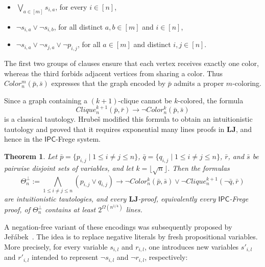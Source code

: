 \documentclass[12pt,a4paper]{article}
\theoremstyle{plain}
\newtheorem{theorem}{Theorem}
\theoremstyle{definition}
\newcommand{\LJ}{\mathbf{LJ}}
\begin{document}
\begin{itemize}
\item[$\bullet$]
$\displaystyle \bigvee_{a\in[m]} s_{i,a}$, for every $i\in[n]$,
\item[$\bullet$]
$\displaystyle \neg s_{i,a}\vee \neg s_{i,b}$, for all distinct $a,b\in[m]$ and $i\in[n]$,
\item[$\bullet$]
$\displaystyle \neg s_{i,a}\vee \neg s_{j,a}\vee \neg p_{i,j}$, for all $a\in[m]$ and distinct $i,j\in[n]$.
\end{itemize}
The first two groups of clauses ensure that each vertex receives exactly one color, whereas the third forbids adjacent vertices from sharing a color. Thus $Color^m_n(\bar p,\bar s)$ expresses that the graph encoded by $\bar p$ admits a proper $m$-coloring.

Since a graph containing a $(k+1)$-clique cannot be $k$-colored, the formula
\[
Clique^{k+1}_n(\bar{p}, \bar{r}) \to \neg Color^{k}_n(\bar{p}, \bar{s})
\]
is a classical tautology. Hrubeš \cite{Hrubes} modified this formula to obtain an intuitionistic tautology and proved that it requires exponential many lines proofs in $\mathbf{LJ}$, and hence in the $\mathsf{IPC}$-Frege system.

\begin{theorem}\label{Hrubes} \cite{Hrubes}
Let $\bar{p}=\{p_{i,j} \mid 1 \leq i \neq j \leq n\}$, $\bar{q}=\{q_{i,j} \mid 1 \leq i \neq j \leq n\}$, $\bar{r}$, and $\bar{s}$ be pairwise disjoint sets of variables, and let $k=\lfloor\sqrt{n}\rfloor$. Then the formulas
\[
\Theta^{\bot}_n := \bigwedge_{1 \leq i \neq j \leq n} (p_{i,j} \vee q_{i,j}) \to \neg Color^{k}_n(\bar{p}, \bar{s}) \vee \neg Clique^{k+1}_n(\neg \bar{q}, \bar{r})
\]
are intuitionistic tautologies, and every $\LJ$-proof, equivalently every $\mathsf{IPC}$-Frege proof, of $\Theta^{\bot}_n$ contains at least $2^{\Omega(n^{1/4})}$ lines.
\end{theorem}

A negation-free variant of these encodings was subsequently proposed by Jeřábek~\cite{jerabek}. The idea is to replace negative literals by fresh propositional variables. More precisely, for every variable $s_{i,l}$ and $r_{i,l}$, one introduces new variables $s'_{i,l}$ and $r'_{i,l}$ intended to represent $\neg s_{i,l}$ and $\neg r_{i,l}$, respectively:
\end{document}
